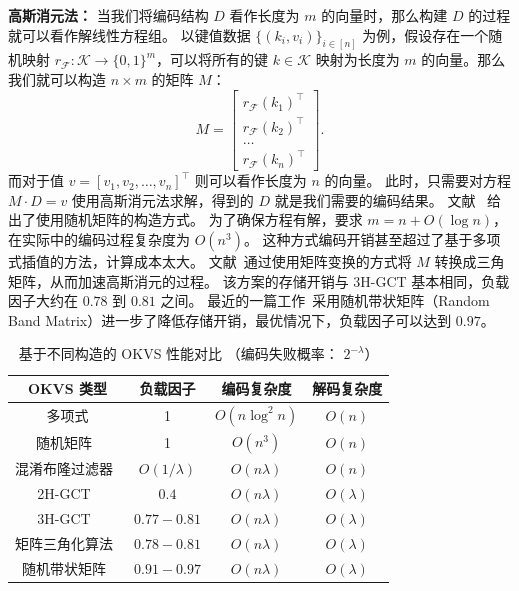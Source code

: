 \textbf{高斯消元法：}
当我们将编码结构 $D$ 看作长度为 $m$ 的向量时，那么构建 $D$ 的过程就可以看作解线性方程组。
以键值数据 $\{(k_i, v_i)\}_{i\in [n]}$ 为例，假设存在一个随机映射 $r_{\mathcal{F}}:\mathcal{K} \to \{0,1\}^m$，可以将所有的键 $k\in \mathcal{K}$ 映射为长度为 $m$ 的向量。那么我们就可以构造 $n\times m$ 的矩阵 $M$：
\begin{equation}
  M = \left[ \begin{array}{c} r_{\mathcal{F}}(k_1)^\intercal \\ r_{\mathcal{F}}(k_2)^\intercal \\ \dots \\ r_{\mathcal{F}}(k_n)^\intercal  \end{array}  \right].
\end{equation}
而对于值 $v=[v_1, v_2, \dots, v_n]^\intercal$ 则可以看作长度为 $n$ 的向量。
此时，只需要对方程 $M\cdot D = v$ 使用高斯消元法求解，得到的 $D$ 就是我们需要的编码结果。
文献~\cite{garimella2021oblivious} 给出了使用随机矩阵的构造方式。
为了确保方程有解，要求 $m = n + O(\log n)$，在实际中的编码过程复杂度为 $O(n^3)$。
这种方式编码开销甚至超过了基于多项式插值的方法，计算成本太大。
文献~\cite{raghuraman2022blazing}通过使用矩阵变换的方式将 $M$ 转换成三角矩阵，从而加速高斯消元的过程。
该方案的存储开销与 3H-GCT 基本相同，负载因子大约在 $0.78$ 到 $0.81$ 之间。
最近的一篇工作~\cite{bienstock2023NearOptimal}采用随机带状矩阵（Random Band Matrix）进一步了降低存储开销，最优情况下，负载因子可以达到 $0.97$。

\begin{table}
  \centering
  \caption{基于不同构造的 OKVS 性能对比 （编码失败概率： $2^{-\lambda}$）}
  \label{tab:okvs_comparison}
  \begin{tabular}{cccc}
    \toprule
    OKVS 类型  &  负载因子  &  编码复杂度 & 解码复杂度 \\
    \midrule
    多项式 & 1 & $O(n\log^2n)$ & $O(n)$ \\
    随机矩阵~\cite{garimella2021oblivious} & 1 & $O(n^3)$ & $O(n)$ \\
    混淆布隆过滤器~\cite{dong2013when} & $O(1/\lambda)$ & $O(n\lambda)$ & $O(n)$ \\
    2H-GCT~\cite{pinkas2020psi} & $0.4$ & $O(n\lambda)$ & $O(\lambda)$ \\
    3H-GCT~\cite{garimella2021oblivious} & $0.77-0.81$ & $O(n\lambda)$ & $O(\lambda)$ \\
    矩阵三角化算法~\cite{raghuraman2022blazing} & $0.78-0.81$ & $O(n\lambda)$ & $O(\lambda)$ \\
    随机带状矩阵~\cite{bienstock2023NearOptimal} & $0.91-0.97$ & $O(n\lambda)$ & $O(\lambda)$ \\
    \bottomrule
  \end{tabular}
\end{table}

